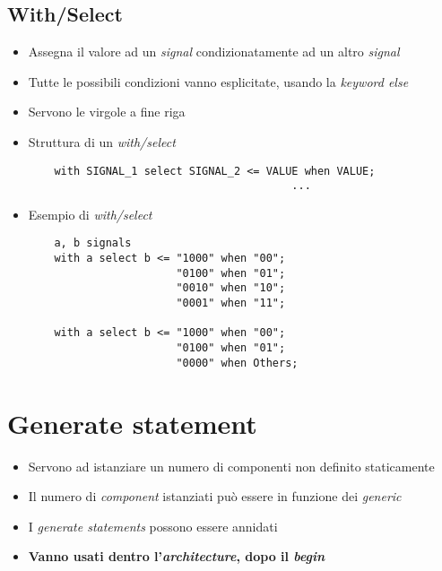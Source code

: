 \documentclass{article}
\begin{document}
\subsection{With/Select}
\begin{itemize}
	\item Assegna il valore ad un \textit{signal} condizionatamente ad un altro \textit{signal}
	\item Tutte le possibili condizioni vanno esplicitate, usando la \textit{keyword else}
	\item Servono le virgole a fine riga
	\item Struttura di un \textit{with/select}
	\begin{verbatim}
    with SIGNAL_1 select SIGNAL_2 <= VALUE when VALUE;
                                         ...
	      \end{verbatim}
	\item Esempio di \textit{with/select}
	      \begin{verbatim}
    a, b signals
    with a select b <= "1000" when "00";
                       "0100" when "01";
                       "0010" when "10";
                       "0001" when "11";
      
    with a select b <= "1000" when "00";
                       "0100" when "01";
                       "0000" when Others;
	      \end{verbatim}
\end{itemize}

\newpage
\newpage 

\section{Generate statement}
\begin{itemize}
	\item Servono ad istanziare un numero di componenti non definito staticamente
	\item Il numero di \textit{component} istanziati può essere in funzione dei \textit{generic} 
	\item I \textit{generate statements} possono essere annidati
	\item \textbf{Vanno usati dentro l'\textit{architecture}, dopo il  \textit{begin}}
\end{itemize}
\end{document}
